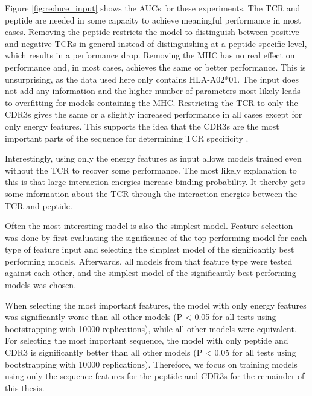 Figure \ref{fig:reduce_input} shows the AUCs for these experiments.  The TCR and peptide are needed in some capacity to achieve meaningful performance in most cases. Removing the peptide restricts the model to distinguish between positive and negative TCRs in general instead of distinguishing at a peptide-specific level, which results in a performance drop. Removing the MHC has no real effect on performance and, in most cases, achieves the same or better performance. This is unsurprising, as the data used here only contains HLA-A02*01. The input does not add any information and the higher number of parameters most likely leads to overfitting for models containing the MHC. Restricting the TCR to only the CDR3s gives the same or a slightly increased performance in all cases except for only energy features. This supports the idea that the CDR3s are the most important parts of the sequence for determining TCR specificity \cite{Glanville2017IdentifyingRepertoire, Wong2019ComparativeReceptors}. 

Interestingly, using only the energy features as input allows models trained even without the TCR to recover some performance. The most likely explanation to this is that large interaction energies increase binding probability. It thereby gets some information about the TCR through the interaction energies between the TCR and peptide.

Often the most interesting model is also the simplest model. Feature selection was done by first evaluating the significance of the top-performing model for each type of feature input and selecting the simplest model of the significantly best performing models. Afterwards, all models from that feature type were tested against each other, and the simplest model of the significantly best performing models was chosen. 

When selecting the most important features, the model with only energy features was significantly worse than all other models (P < 0.05 for all tests using bootstrapping with 10000 replications), while all other models were equivalent. For selecting the most important sequence, the model with only peptide and CDR3 is significantly better than all other models (P < 0.05 for all tests using bootstrapping with 10000 replications). Therefore, we focus on training models using only the sequence features for the peptide and CDR3s for the remainder of this thesis.

